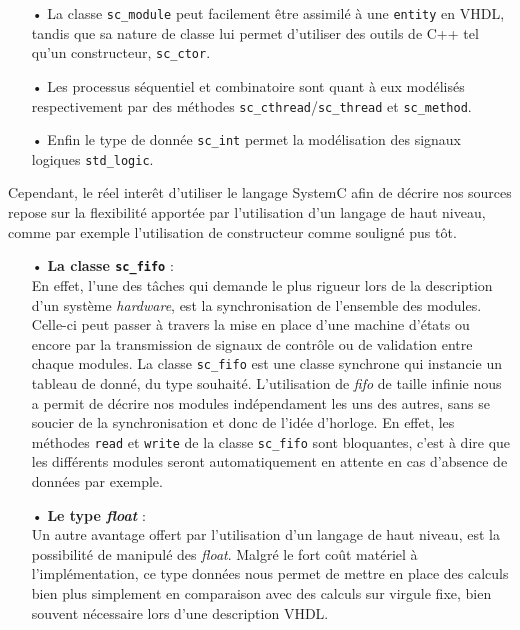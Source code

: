 \documentclass[a4paper,12pt]{article}
\begin{document}
\begin{itemize}
\item[•] La classe \texttt{sc\_module} peut facilement être assimilé à une \texttt{entity} en VHDL, tandis que sa nature de classe lui permet d'utiliser des outils de C++ tel qu'un constructeur, \texttt{sc\_ctor}.
\item[•] Les processus séquentiel et combinatoire sont quant à eux modélisés respectivement par des méthodes \texttt{sc\_cthread}/\texttt{sc\_thread} et \texttt{sc\_method}.
\item[•] Enfin le type de donnée \texttt{sc\_int} permet la modélisation des signaux logiques \texttt{std\_logic}.\\
\end{itemize}

Cependant, le réel interêt d'utiliser le langage SystemC afin de décrire nos sources repose sur la flexibilité apportée par l'utilisation d'un langage de haut niveau, comme par exemple l'utilisation de constructeur comme souligné pus tôt.

\begin{itemize}
\item[•] \textbf{La classe \texttt{sc\_fifo}} :\\
En effet, l'une des tâches qui demande le plus rigueur lors de la description d'un système \textit{hardware}, est la synchronisation de l'ensemble des modules. Celle-ci peut passer à travers la mise en place d'une machine d'états ou encore par la transmission de signaux de contrôle ou de validation entre chaque modules. La classe \texttt{sc\_fifo} est une classe synchrone qui instancie un tableau de donné, du type souhaité. L'utilisation de \textit{fifo} de taille infinie nous a permit de décrire nos modules indépendament les uns des autres, sans se soucier de la synchronisation et donc de l'idée d'horloge. En effet, les méthodes \texttt{read} et \texttt{write} de la classe \texttt{sc\_fifo} sont bloquantes, c'est à dire que les différents modules seront automatiquement en attente en cas d'absence de données par exemple.\\

\item[•] \textbf{Le type \textit{float}} :\\
Un autre avantage offert par l'utilisation d'un langage de haut niveau, est la possibilité de manipulé des \textit{float}. Malgré le fort coût matériel à l'implémentation, ce type données nous permet de mettre en place des calculs bien plus simplement en comparaison avec des calculs sur virgule fixe, bien souvent nécessaire lors d'une description VHDL.\\
\end{itemize}
\end{document}
